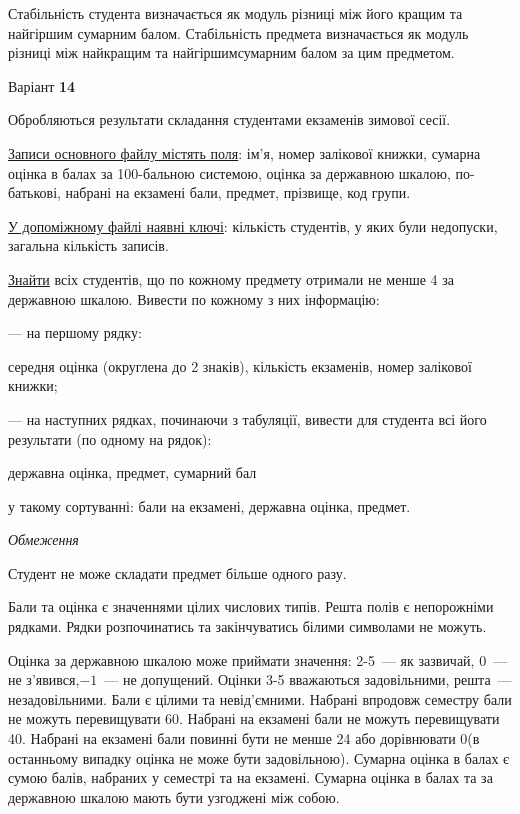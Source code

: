 \documentclass[11pt, ukrainian]{article}
\begin{document}
Стабільність студента визначається як модуль різниці між його кращим та найгіршим сумарним балом.
Стабільність предмета визначається як модуль різниці між найкращим та найгіршимсумарним балом за цим предметом.




\par
\newpage
{\center Варіант  \No \textbf { 14 }\par}
\bigskip
Обробляються результати складання студентами екзаменів зимової сесії.

\underline{Записи основного файлу містять поля}: ім’я, номер залікової книжки, сумарна оцінка в балах за 100-бальною системою, оцінка за державною шкалою, по-батькові, набрані на екзамені бали, предмет, прізвище, код групи.

\underline{У допоміжному файлі наявні ключі}: кількість студентів, у яких були недопуски, загальна кількість записів.

\underline{Знайти} всіх студентів, що по кожному предмету отримали не менше 4 за державною шкалою. Вивести по кожному з них інформацію:\par
{\noindent}--- на першому рядку:\par
середня оцінка (округлена до 2 знаків), кількість екзаменів, номер залікової книжки;

{\noindent}--- на наступних рядках, починаючи з табуляції, вивести для студента всі його результати (по одному на рядок):\par
державна оцінка, предмет, сумарний бал

{\noindent}у такому сортуванні: бали на екзамені, державна оцінка, предмет.


\bigskip\textit{Обмеження}

Студент не може складати предмет більше одного разу.

Бали та оцінка є значеннями цілих числових типів. Решта полів є непорожніми рядками.
Рядки розпочинатись та закінчуватись білими символами не можуть.

Оцінка за державною шкалою може приймати значення: 2-5~--- як зазвичай, 0~--- не з’явився,$-1$~--- не допущений. 
Оцінки 3-5 вважаються задовільними, решта~--- незадовільними. 
Бали є цілими та невід’ємними.
Набрані впродовж семестру бали не можуть перевищувати 60. 
Набрані на екзамені бали не можуть перевищувати 40. 
Набрані на екзамені бали повинні бути не менше 24 або дорівнювати 0(в останньому випадку оцінка не може бути задовільною). 
Сумарна оцінка в балах є сумою балів, набраних у семестрі та на екзамені.
Сумарна оцінка в балах та за державною шкалою мають бути узгоджені між собою.
\end{document}
